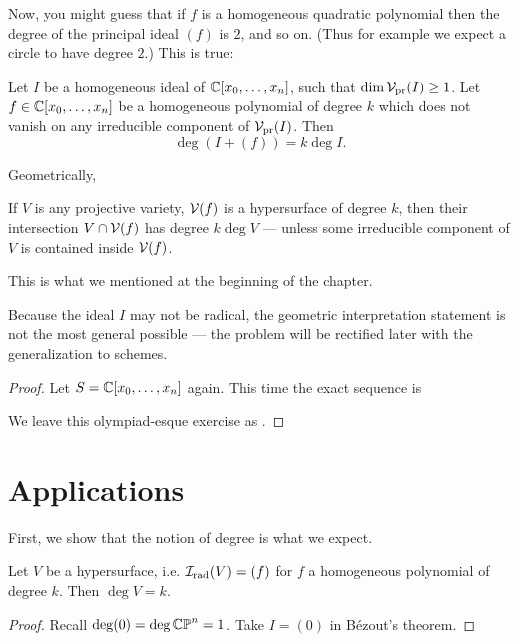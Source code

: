 Now, you might guess that if $f$ is a homogeneous quadratic polynomial
then the degree of the principal ideal $(f)$ is $2$, and so on.
(Thus for example we expect a circle to have degree $2$.)
This is true:

\begin{theorem}
	Let $I$ be a homogeneous ideal of $\mathbb C[x_0, \dots, x_n]$,
	such that $\dim \mathcal V_{\text{pr}}(I) \ge 1$.
	Let $f \in \mathbb C[x_0, \dots, x_n]$ be a homogeneous polynomial of degree $k$
	which does not vanish on any irreducible component of $\mathcal V_{\text{pr}}(I)$.
	Then
	\[ \deg\left( I + (f) \right) = k \deg I. \]
\end{theorem}
Geometrically,
\begin{moral}
	If $V$ is any projective variety, $\mathcal V(f)$ is a hypersurface of degree $k$, then their
	intersection $V \cap \mathcal V(f)$ has degree $k \deg V$ --- unless
	some irreducible component of $V$ is contained inside $\mathcal V(f)$.
\end{moral}
This is what we mentioned at the beginning of the chapter.

Because the ideal $I$ may not be radical, the geometric interpretation statement is not the most general
possible --- the problem will be rectified later with the generalization to schemes.

\begin{proof}
	Let $S = \mathbb C[x_0, \dots, x_n]$ again.
	This time the exact sequence is
	\begin{center}
	\end{center}
	We leave this olympiad-esque exercise as .
\end{proof}

\section{Applications}
First, we show that the notion of degree is what we expect.
\begin{corollary}
	Let $V$ be a hypersurface, i.e. $\mathcal I_{\text{rad}}(V) = (f)$
	for $f$ a homogeneous polynomial of degree $k$.
	Then $\deg V = k$.
\end{corollary}
\begin{proof}
	Recall $\deg(0) = \deg \mathbb{CP}^n = 1$.
	Take $I = (0)$ in B\'ezout's theorem.
\end{proof}

